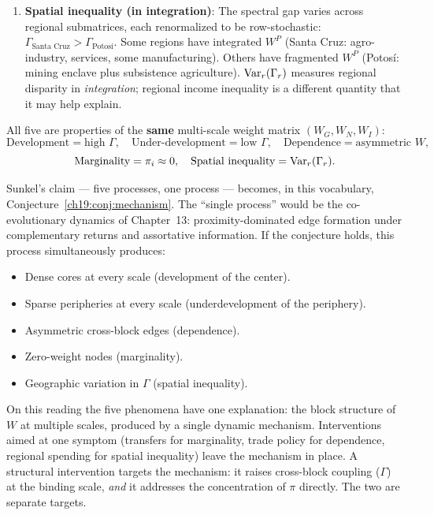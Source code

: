 \documentclass[../structural_economics_book.tex]{subfiles}
\begin{document}
\begin{definition}
\begin{enumerate}
\item \textbf{Spatial inequality (in integration)}: The spectral gap varies across regional submatrices, each renormalized to be row-stochastic: $\Gamma_{\text{Santa Cruz}} > \Gamma_{\text{Potos\'{i}}}$. Some regions have integrated $W^P$ (Santa Cruz: agro-industry, services, some manufacturing). Others have fragmented $W^P$ (Potos\'{i}: mining enclave plus subsistence agriculture). $\operatorname{Var}_r(\Gamma_r)$ measures regional disparity in \emph{integration}; regional income inequality is a different quantity that it may help explain.
\end{enumerate}

All five are properties of the \textbf{same} multi-scale weight matrix $(W_G, W_N, W_I)$:
\begin{equation}\label{ch19:eq:five}
\text{Development} = \text{high } \Gamma, \quad \text{Under-development} = \text{low } \Gamma, \quad \text{Dependence} = \text{asymmetric } W,
\end{equation}
\begin{equation}
\text{Marginality} = \pi_i \approx 0, \quad \text{Spatial inequality} = \operatorname{Var}_r(\Gamma_r).
\end{equation}
\end{definition}

\begin{keyinsight}
Sunkel's claim --- five processes, one process --- becomes, in this vocabulary, Conjecture~\ref{ch19:conj:mechanism}. The ``single process'' would be the co-evolutionary dynamics of Chapter~13: proximity-dominated edge formation under complementary returns and assortative information. If the conjecture holds, this process simultaneously produces:
\begin{itemize}
\item Dense cores at every scale (development of the center).
\item Sparse peripheries at every scale (underdevelopment of the periphery).
\item Asymmetric cross-block edges (dependence).
\item Zero-weight nodes (marginality).
\item Geographic variation in $\Gamma$ (spatial inequality).
\end{itemize}

On this reading the five phenomena have one explanation: the block structure of $W$ at multiple scales, produced by a single dynamic mechanism. Interventions aimed at one symptom (transfers for marginality, trade policy for dependence, regional spending for spatial inequality) leave the mechanism in place. A structural intervention targets the mechanism: it raises cross-block coupling ($\Gamma$) at the binding scale, \emph{and} it addresses the concentration of $\pi$ directly. The two are separate targets.
\end{keyinsight}
\end{document}
